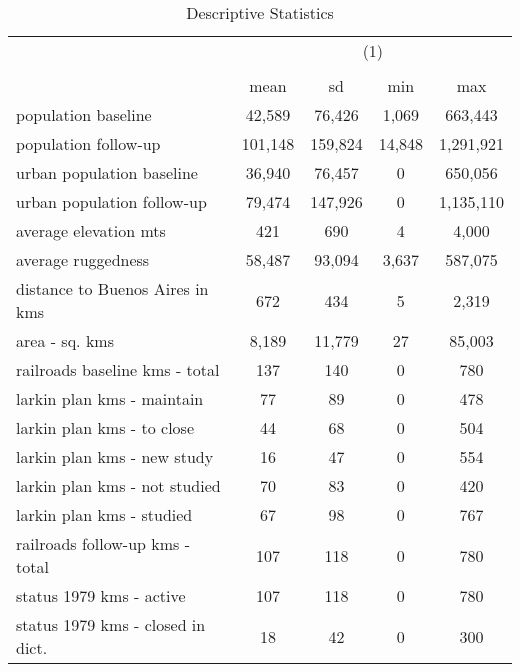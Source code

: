 \begin{table}[htbp]\centering
\def\sym#1{\ifmmode^{#1}\else\(^{#1}\)\fi}
\caption{Descriptive Statistics}
\begin{tabular}{l*{1}{cccc}}
\hline\hline
                    &\multicolumn{4}{c}{(1)}                            \\
                    &\multicolumn{4}{c}{}                               \\
                    &        mean&          sd&         min&         max\\
\hline
population baseline &      42,589&      76,426&       1,069&     663,443\\
population follow-up&     101,148&     159,824&      14,848&   1,291,921\\
urban population baseline&      36,940&      76,457&           0&     650,056\\
urban population follow-up&      79,474&     147,926&           0&   1,135,110\\
average elevation mts&         421&         690&           4&       4,000\\
average ruggedness  &      58,487&      93,094&       3,637&     587,075\\
distance to Buenos Aires in kms&         672&         434&           5&       2,319\\
area - sq. kms      &       8,189&      11,779&          27&      85,003\\
railroads baseline kms - total&         137&         140&           0&         780\\
larkin plan kms - maintain&          77&          89&           0&         478\\
larkin plan kms - to close&          44&          68&           0&         504\\
larkin plan kms - new study&          16&          47&           0&         554\\
larkin plan kms - not studied&          70&          83&           0&         420\\
larkin plan kms - studied&          67&          98&           0&         767\\
railroads follow-up kms - total&         107&         118&           0&         780\\
status 1979 kms - active&         107&         118&           0&         780\\
status 1979 kms - closed in dict.&          18&          42&           0&         300\\

\end{tabular}
\end{table}
